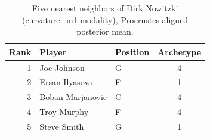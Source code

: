 \begin{table}[htbp]
  \centering\small
  \begin{tabular}{rllc}
    \toprule
    Rank & Player & Position & Archetype \\
    \midrule
    1 & Joe Johnson & G & 4 \\
    2 & Ersan Ilyasova & F & 1 \\
    3 & Boban Marjanovic & C & 4 \\
    4 & Troy Murphy & F & 4 \\
    5 & Steve Smith & G & 1 \\
    \bottomrule
  \end{tabular}
  \caption{Five nearest neighbors of Dirk Nowitzki (curvature_m1 modality), Procrustes-aligned posterior mean.}
  \label{tab:Dirk_Nowitzki_neighbors_curvature_m1}
\end{table}


